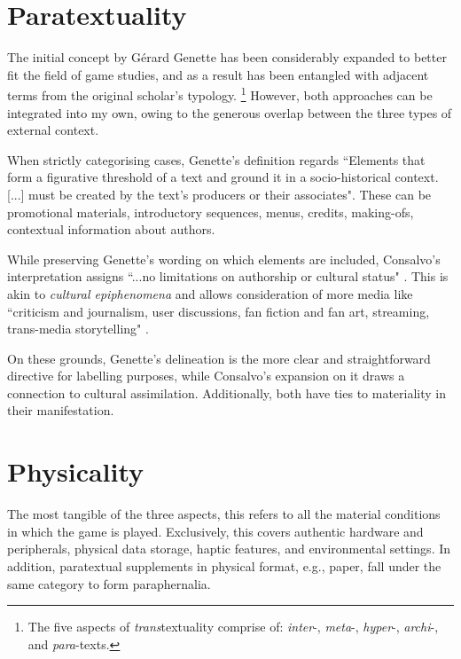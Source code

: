 \documentclass[12pt,oneside]{book}
\begin{document}
\section{Paratextuality}  
    The initial concept by G\'{e}rard Genette \parencite*{genette} has been considerably expanded to better fit the field of game studies, and as a result has been entangled with adjacent terms from the original scholar's typology. \footnote{The five aspects of \textit{trans}textuality comprise of: \textit{inter}-, \textit{meta}-, \textit{hyper}-, \textit{archi}-, and \textit{para}-texts.}
    However, both approaches can be integrated into my own, owing to the generous overlap between the three types of external context.\par
    When strictly categorising cases, Genette's definition regards 
    ``Elements that form a figurative threshold of a text and ground it in a socio-historical context. [...] must be created by the text’s producers or their associates".
    These can be promotional materials, introductory sequences, menus, credits, making-ofs, contextual information about authors.\par
    While preserving Genette's wording on which elements are included, Consalvo's interpretation assigns ``...no limitations on authorship or cultural status" \parencite*{consalvo}. 
    This is akin to \textit{cultural epiphenomena} and allows consideration of more media like ``criticism and journalism, user discussions, fan fiction and fan art, streaming, trans-media storytelling" \parencite{svelch}.\par
    On these grounds, Genette's delineation is the more clear and straightforward directive for labelling purposes, while Consalvo's expansion on it draws a connection to cultural assimilation.
    Additionally, both have ties to materiality in their manifestation.
\section{Physicality}
The most tangible of the three aspects, this refers to all the material conditions in which the game is played.
Exclusively, this covers authentic hardware and peripherals, physical data storage, haptic features, and environmental settings.
In addition, paratextual supplements in physical format, e.g., paper, fall under the same category to form paraphernalia.
\end{document}
